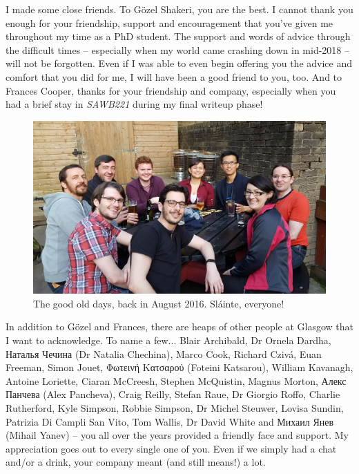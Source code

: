 \begin{preamble}
I made some close friends. To G\"{o}zel Shakeri, you are the best. I cannot thank you enough for your friendship, support and encouragement that you've given me throughout my time as a PhD student. The support and words of advice through the difficult times -- especially when my world came crashing down in mid-2018 -- will not be forgotten. Even if I was able to even begin offering you the advice and comfort that you did for me, I will have been a good friend to you, too. And to Frances Cooper, thanks for your friendship and company, especially when you had a brief stay in \emph{SAWB221} during my final writeup phase!

\renewcommand{\figurename}{Picture}
\begin{figure}
    \begin{center}
    \vspace*{-9mm}
    \includegraphics[width=1\textwidth]{figures/ch0-brel.jpg}
    \end{center}
    \vspace*{-6mm}
    \caption[]{The good old days, back in August 2016. Sl\'{a}inte, everyone!}
    \label{fig:acks_friends}
\end{figure}
\renewcommand{\figurename}{Figure}

In addition to G\"{o}zel and Frances, there are heaps of other people at Glasgow that I want to acknowledge. To name a few... Blair Archibald, Dr Ornela Dardha, Наталья Чечина (Dr Natalia Chechina), Marco Cook, Richard Cziv\'{a}, Euan Freeman, Simon Jouet, Φωτεινή Κατσαρού (Foteini Katsarou), William Kavanagh, Antoine Loriette, Ciaran McCreesh, Stephen McQuistin, Magnus Morton, Алекс Панчева (Alex Pancheva), Craig Reilly, Stefan Raue, Dr Giorgio Roffo, Charlie Rutherford, Kyle Simpson, Robbie Simpson, Dr Michel Steuwer, Lovisa Sundin, Patrizia Di Campli San Vito, Tom Wallis, Dr David White and Михаил Янев (Mihail Yanev) -- you all over the years provided a friendly face and support. My appreciation goes out to every single one of you. Even if we simply had a chat and/or a drink, your company meant (and still means!) a lot.


\end{preamble}
